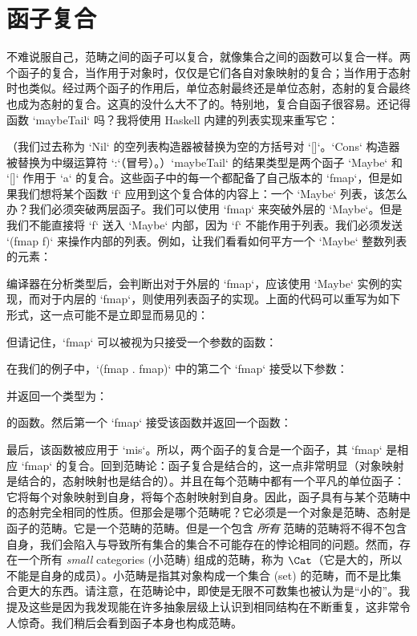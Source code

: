\section{函子复合}

不难说服自己，范畴之间的函子可以复合，就像集合之间的函数可以复合一样。两个函子的复合，当作用于对象时，仅仅是它们各自对象映射的复合；当作用于态射时也类似。经过两个函子的作用后，单位态射最终还是单位态射，态射的复合最终也成为态射的复合。这真的没什么大不了的。特别地，复合自函子很容易。还记得函数 `maybeTail` 吗？我将使用 Haskell 内建的列表实现来重写它：

（我们过去称为 `Nil` 的空列表构造器被替换为空的方括号对 `[]`。`Cons` 构造器被替换为中缀运算符 `:`（冒号）。）`maybeTail` 的结果类型是两个函子 `Maybe` 和 `[]` 作用于 `a` 的复合。这些函子中的每一个都配备了自己版本的 `fmap`，但是如果我们想将某个函数 `f` 应用到这个复合体的内容上：一个 `Maybe` 列表，该怎么办？我们必须突破两层函子。我们可以使用 `fmap` 来突破外层的 `Maybe`。但是我们不能直接将 `f` 送入 `Maybe` 内部，因为 `f` 不能作用于列表。我们必须发送 `(fmap f)` 来操作内部的列表。例如，让我们看看如何平方一个 `Maybe` 整数列表的元素：

编译器在分析类型后，会判断出对于外层的 `fmap`，应该使用 `Maybe` 实例的实现，而对于内层的 `fmap`，则使用列表函子的实现。上面的代码可以重写为如下形式，这一点可能不是立即显而易见的：

但请记住，`fmap` 可以被视为只接受一个参数的函数：

在我们的例子中，`(fmap . fmap)` 中的第二个 `fmap` 接受以下参数：

并返回一个类型为：

的函数。然后第一个 `fmap` 接受该函数并返回一个函数：

最后，该函数被应用于 `mis`。所以，两个函子的复合是一个函子，其 `fmap` 是相应 `fmap` 的复合。回到范畴论：函子复合是结合的，这一点非常明显（对象映射是结合的，态射映射也是结合的）。并且在每个范畴中都有一个平凡的单位函子：它将每个对象映射到自身，将每个态射映射到自身。因此，函子具有与某个范畴中的态射完全相同的性质。但那会是哪个范畴呢？它必须是一个对象是范畴、态射是函子的范畴。它是一个范畴的范畴。但是一个包含 \emph{所有} 范畴的范畴将不得不包含自身，我们会陷入与导致所有集合的集合不可能存在的悖论相同的问题。然而，存在一个所有 \emph{small} categories (小范畴) 组成的范畴，称为 $\Cat$（它是大的，所以不能是自身的成员）。小范畴是指其对象构成一个集合 (set) 的范畴，而不是比集合更大的东西。请注意，在范畴论中，即使是无限不可数集也被认为是“小的”。我提及这些是因为我发现能在许多抽象层级上认识到相同结构在不断重复，这非常令人惊奇。我们稍后会看到函子本身也构成范畴。

